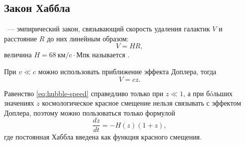 \subsection{Закон Хаббла}
~--- эмпирический закон, связывающий скорость удаления галактик $V$ и расстояние $R$ до них линейным образом: 
\begin{equation}
	V = H R,
\end{equation}
величина $H=68~\text{км/c} \cdot \text{Мпк}$ называется .

При $v \ll c$ можно использовать приближение эффекта Доплера, тогда
\begin{equation}
	V = c z.
\label{eq:hubble-speed}
\end{equation}

Равенство \eqref{eq:hubble-speed} справедливо только при $z \ll 1$, а при б\'{o}льших значениях $z$ космологическое красное смещение нельзя связывать с эффектом Доплера, поэтому можно пользоваться только формулой 
\begin{equation}
	\frac{dz}{dt} = - H(z)(1+z),
\end{equation}
где постоянная Хаббла введена как функция красного смещения.